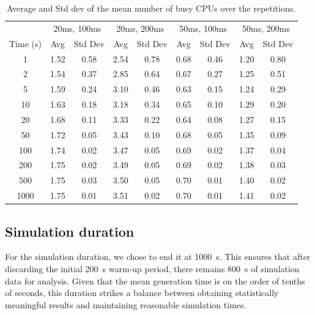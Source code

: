 \begin{table}[H]
\centering
\begin{tabular}{c|cc|cc|cc|cc}
 & \multicolumn{2}{c|}{20ms, 100ms} & \multicolumn{2}{c|}{20ms, 200ms} & \multicolumn{2}{c|}{50ms, 100ms} & \multicolumn{2}{c}{50ms, 200ms} \\
 Time (s) & Avg & Std Dev & Avg & Std Dev & Avg & Std Dev & Avg & Std Dev \\
\midrule
1 & 1.52 & 0.58 & 2.54 & 0.78 & 0.68 & 0.46 & 1.20 & 0.80 \\
2 & 1.54 & 0.37 & 2.85 & 0.64 & 0.67 & 0.27 & 1.25 & 0.51 \\
5 & 1.59 & 0.24 & 3.10 & 0.46 & 0.63 & 0.15 & 1.24 & 0.29 \\
10 & 1.63 & 0.18 & 3.18 & 0.34 & 0.65 & 0.10 & 1.29 & 0.20 \\
20 & 1.68 & 0.11 & 3.33 & 0.22 & 0.64 & 0.08 & 1.27 & 0.15 \\
50 & 1.72 & 0.05 & 3.43 & 0.10 & 0.68 & 0.05 & 1.35 & 0.09 \\
100 & 1.74 & 0.02 & 3.47 & 0.05 & 0.69 & 0.02 & 1.37 & 0.04 \\
200 & 1.75 & 0.02 & 3.49 & 0.05 & 0.69 & 0.02 & 1.38 & 0.03 \\
500 & 1.75 & 0.03 & 3.50 & 0.05 & 0.70 & 0.01 & 1.40 & 0.02 \\
1000 & 1.75 & 0.01 & 3.51 & 0.02 & 0.70 & 0.01 & 1.41 & 0.02 \\
\end{tabular}
\caption{Average and Std dev of the mean number of busy CPUs over the repetitions.}
\label{tab:stabilization}
\end{table}

\subsection{Simulation duration}

For the simulation duration, we chose to end it at \SI{1000}{\second}. This ensures that after discarding the initial \SI{200}{\second} warm-up period, there remains \SI{800}{\second} of simulation data for analysis. Given that the mean generation time is on the order of tenths of seconds, this duration strikes a balance between obtaining statistically meaningful results and maintaining reasonable simulation times.